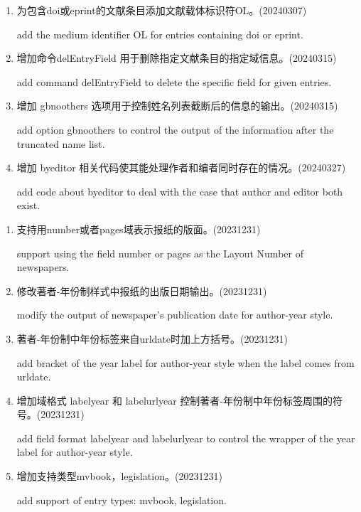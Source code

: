 \label{up:20240327}
\begin{enumerate}

\item 为包含doi或eprint的文献条目添加文献载体标识符OL。(20240307)

add the medium identifier OL for entries containing doi or eprint.

\item 增加命令delEntryField 用于删除指定文献条目的指定域信息。(20240315)

add command delEntryField to delete the specific field for given entries.

\item 增加 gbnoothers 选项用于控制姓名列表截断后的信息的输出。(20240315)

add option gbnoothers to control the output of the information after the truncated name list.

\item 增加 byeditor 相关代码使其能处理作者和编者同时存在的情况。(20240327)

add code about byeditor to deal with the case that author and editor both exist.

\end{enumerate}



\label{up:20240210}
\begin{enumerate}

\item 支持用number或者pages域表示报纸的版面。(20231231)

support using the field number or pages as the Layout Number of newspapers.

\item 修改著者-年份制样式中报纸的出版日期输出。(20231231)

modify the output of newspaper's publication date for author-year style.

\item 著者-年份制中年份标签来自urldate时加上方括号。(20231231)

add bracket of the year label for author-year style when the label comes from urldate.

\item 增加域格式 labelyear 和 labelurlyear 控制著者-年份制中年份标签周围的符号。(20231231)

add field format labelyear and labelurlyear to control the wrapper of the year label for author-year style.

\item 增加支持类型mvbook，legislation。(20231231)

add support of entry types: mvbook, legislation.

\end{enumerate}



